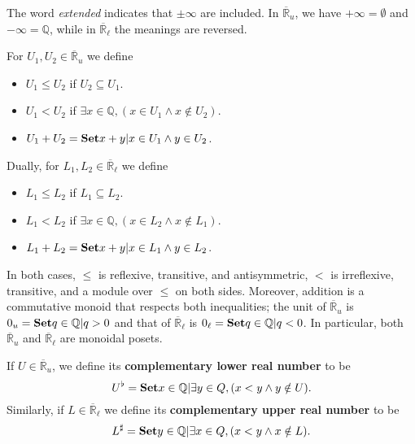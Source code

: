 \documentclass{article}
\def\Q{\mathbb{Q}}
\def\R{\mathbb{R}}
\def\Re{\overline{\R}}
\def\Reu{\Re_u}
\def\Rel{\Re_{\ell}}
\def\upp#1{{#1}^{\sharp}}
\def\low#1{{#1}^{\flat}}
\begin{document}
The word \emph{extended} indicates that $\pm\infty$ are included.
In $\Reu$, we have $+\infty = \emptyset$ and $-\infty = \Q$, while in $\Rel$ the meanings are reversed.

For $U_1,U_2\in \Reu$ we define
\begin{itemize}
\item $U_1 \le U_2$ if $U_2\subseteq U_1$.
\item $U_1 < U_2$ if $\exists x\in \Q, (x\in U_1 \land x\notin U_2)$.
\item $U_1 + U_2 = \setof{x+y | x\in U_1 \land y\in U_2}$.
\end{itemize}
Dually, for $L_1,L_2 \in\Rel$ we define
\begin{itemize}
\item $L_1 \le L_2$ if $L_1\subseteq L_2$.
\item $L_1 < L_2$ if $\exists x\in \Q, (x\in L_2 \land x\notin L_1)$.
\item $L_1 + L_2 = \setof{x+y | x\in L_1 \land y\in L_2}$.
\end{itemize}
In both cases, $\le$ is reflexive, transitive, and antisymmetric, $<$ is irreflexive, transitive, and a module over $\le$ on both sides.
Moreover, addition is a commutative monoid that respects both inequalities; the unit of $\Reu$ is $0_u = \setof{q\in \Q | q > 0}$ and that of $\Rel$ is $0_\ell = \setof{q\in \Q | q < 0}$.
In particular, both $\Reu$ and $\Rel$ are monoidal posets.

If $U\in\Reu$, we define its \textbf{complementary lower real number} to be
\[ \low U = \setof{x\in\Q | \exists y\in Q, (x<y \land y\notin U)}. \]
Similarly, if $L\in\Rel$ we define its \textbf{complementary upper real number} to be
\[ \upp L = \setof{y\in\Q | \exists x\in Q, (x<y \land x\notin L)}. \]
\end{document}
